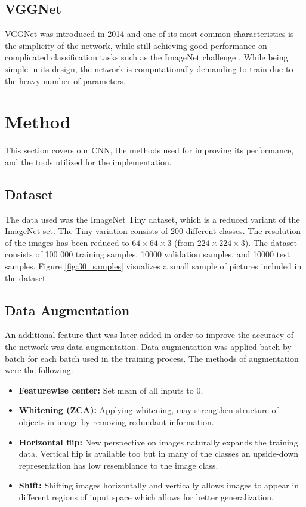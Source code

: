 \documentclass{kthreport}
\begin{document}
\subsection{VGGNet}
VGGNet was introduced in 2014 and one of its most common characteristics is the simplicity of the network, while still achieving good performance on complicated classification tasks such as the ImageNet challenge \cite{simonyan2014very}. While being simple in its design, the network is computationally demanding to train due to the heavy number of parameters.


\section{Method}
This section covers our CNN, the methods used for improving its performance, and the tools utilized for the implementation.

\subsection{Dataset}
The data used was the ImageNet Tiny dataset, which is a reduced variant of the ImageNet set. The Tiny variation consists of 200 different classes. The resolution of the images has been reduced to $64\times64\times3$ (from  $224\times224\times3$). The dataset consists of 100 000 training samples, 10000 validation samples, and 10000 test samples.
Figure \ref{fig:30_samples} visualizes a small sample of pictures included in the dataset.



\subsection{Data Augmentation}
\label{DataAugmentation}
An additional feature that was later added in order to improve the accuracy of the network was data augmentation. Data augmentation was applied batch by batch for each batch used in the training process. The methods of augmentation were the following:

\begin{itemize}
  \item \textbf{Featurewise center:} Set mean of all inputs to 0.
  \item \textbf{Whitening (ZCA):} Applying whitening, may strengthen structure of objects in image by removing redundant information.
  \item \textbf{Horizontal flip:} New perspective on images naturally expands the training data. Vertical flip is available too but in many of the classes an upside-down representation has low resemblance to the image class.
  \item \textbf{Shift:} Shifting images horizontally and vertically allows images to appear in different regions of input space which allows for better generalization.
\end{itemize}
\end{document}
